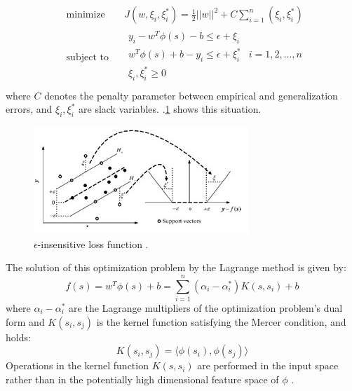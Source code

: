 \documentclass[review,authoryear,english]{elsarticle}
\begin{document}
\begin{equation} 
\begin{aligned}
& \underset{}{\text{minimize}}
& & J(w,\xi_i , \xi_i^* ) = \frac{1}{2}   \Bigr| \Bigr| w \Bigr| \Bigr|^2 + C \sum_{i=1}^{n} (\xi_i , \xi_i^* )    \\
& \text{subject to}
& & \begin{array}{lcl} 
y_i - w^T \phi (s) - b  \leq \epsilon + \xi_i   \\
w^T \phi (s) + b - y_i \leq \epsilon + \xi_i^* & i= 1,2,...,n \\
\xi_i , \xi_i^* \geq 0  \\
\end{array}
\end{aligned}
\end{equation}  
where $C$ denotes the penalty parameter between empirical and generalization errors, and  $\xi_i , \xi_i^*$ are slack variables. \figurename
$.$\ref{figura2} shows this situation.

\begin{figure}[h] 
 \centering
 \includegraphics[scale=.9]{SVR}
 \caption{$\epsilon$-insensitive loss function \citep{Wei2013}.} 
 \label{figura2} 
\end{figure}
 
The solution of this optimization problem by the Lagrange method is given by:\\
$$ f(s) = w^T \phi (s) + b = \sum_{i=1}^{n} (\alpha_i - \alpha_i^*) K (s,s_i) + b $$ 
where $\alpha_i - \alpha_i^*$  are the Lagrange multipliers of the optimization problem’s dual form and $K(s_i,s_j )$ is the kernel function satisfying the Mercer condition, and holds:
$$K(s_i,s_j ) = \big \langle  \phi(s_i) , \phi(s_j)  \big \rangle $$
Operations in the kernel function $K(s,s_i )$ are performed in the input space rather than in the potentially high dimensional feature space of $\phi$ \citep{Alonso2013}.
\end{document}

